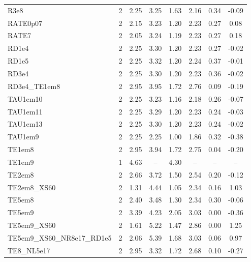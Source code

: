 \begin{tabular}{@{}l@{\,}c@{\,}c@{\,}c@{\,}c@{\,}c@{\,}c@{\,}c@{}}
R3e8 & 2 & 2.25 & 3.25 & 1.63 & 2.16 & 0.34 & -0.09 \\
RATE0p07 & 2 & 2.15 & 3.23 & 1.20 & 2.23 & 0.27 & 0.08 \\
RATE7 & 2 & 2.05 & 3.24 & 1.19 & 2.23 & 0.27 & 0.18 \\
RD1e4 & 2 & 2.25 & 3.30 & 1.20 & 2.23 & 0.27 & -0.02 \\
RD1e5 & 2 & 2.25 & 3.32 & 1.20 & 2.24 & 0.37 & -0.01 \\
RD3e4 & 2 & 2.25 & 3.30 & 1.20 & 2.23 & 0.36 & -0.02 \\
RD3e4\_TE1em8 & 2 & 2.95 & 3.95 & 1.72 & 2.76 & 0.09 & -0.19 \\
TAU1em10 & 2 & 2.25 & 3.23 & 1.16 & 2.18 & 0.26 & -0.07 \\
TAU1em11 & 2 & 2.25 & 3.29 & 1.20 & 2.23 & 0.24 & -0.03 \\
TAU1em13 & 2 & 2.25 & 3.30 & 1.20 & 2.23 & 0.24 & -0.02 \\
TAU1em9 & 2 & 2.25 & 2.25 & 1.00 & 1.86 & 0.32 & -0.38 \\
TE1em8 & 2 & 2.95 & 3.94 & 1.72 & 2.75 & 0.04 & -0.20 \\
TE1em9 & 1 & 4.63 & -- & 4.30 & -- & -- & -- \\
TE2em8 & 2 & 2.66 & 3.72 & 1.50 & 2.54 & 0.20 & -0.12 \\
TE2em8\_XS60 & 2 & 1.31 & 4.44 & 1.05 & 2.34 & 0.16 & 1.03 \\
TE5em8 & 2 & 2.40 & 3.48 & 1.30 & 2.34 & 0.30 & -0.06 \\
TE5em9 & 2 & 3.39 & 4.23 & 2.05 & 3.03 & 0.00 & -0.36 \\
TE5em9\_XS60 & 2 & 1.61 & 5.22 & 1.47 & 2.86 & 0.00 & 1.25 \\
TE5em9\_XS60\_NR8e17\_RD1e5 & 2 & 2.06 & 5.39 & 1.68 & 3.03 & 0.06 & 0.97 \\
TE8\_NL5e17 & 2 & 2.95 & 3.32 & 1.72 & 2.68 & 0.10 & -0.27 \\
\bottomrule\end{tabular}\hfill
